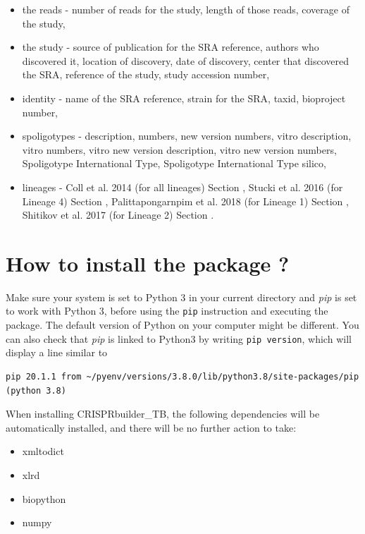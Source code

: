 \documentclass[twoside,a4paper,11pt,frenchb,openany]{report}
\begin{document}
\begin{itemize}
\item
  the reads - number of reads for the study, length of those reads,
  coverage of the study,
\item
  the study - source of publication for the SRA reference, authors who
  discovered it, location of discovery, date of discovery, center that
  discovered the SRA, reference of the study, study accession number,
\item
  identity - name of the SRA reference, strain for the SRA, taxid,
  bioproject number,
\item
  spoligotypes - description, numbers, new version numbers, vitro
  description, vitro numbers, vitro new version description, vitro new
  version numbers, Spoligotype International Type, Spoligotype
  International Type silico,
\item
  lineages - Coll et al. 2014 (for all lineages) Section \cite{coll-preston},
  Stucki et al. 2016 (for Lineage 4) Section \cite{stucki-brites},
  Palittapongarnpim et al. 2018 (for Lineage 1) Section \cite{pali-ajaw},
  Shitikov et al. 2017 (for Lineage 2) Section \cite{shiti-kolchenko}.
\end{itemize}


    \section{How to install the package
?}\label{how-to-install-the-package}

Make sure your system is set to Python 3 in your current directory and \textit{pip} is set to work with Python 3, before using the \texttt{pip} instruction and executing the package. The default version of Python on your computer might be different. You can also check that \textit{pip} is linked to Python3 by writing \texttt{pip \textemdash \textemdash version}, which will display a line similar to

\begin{verbatim}
pip 20.1.1 from ~/pyenv/versions/3.8.0/lib/python3.8/site-packages/pip (python 3.8)
\end{verbatim}

When installing CRISPRbuilder\_TB, the following dependencies will be automatically installed, and there will be no further action to take:
\begin{itemize}
\item xmltodict
\item xlrd
\item biopython
\item numpy
\end{itemize}
\end{document}
